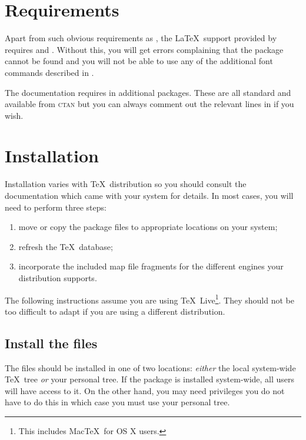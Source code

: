\documentclass[11pt,british]{article}
\begin{document}
\section{Requirements}

Apart from such obvious requirements as \LaTeXe, the \LaTeX\ support provided by  requires  and . Without this, you will get errors complaining that the package cannot be found and you will not be able to use any of the additional font commands described in .

The documentation requires in additional packages. These are all standard and available from \textsc{ctan} but you can always comment out the relevant lines in  if you wish.

\section{Installation}

Installation varies with \TeX\ distribution so you should consult the documentation which came with your system for details. In most cases, you will need to perform three steps:
		\begin{enumerate}
			\item move or copy the package files to appropriate locations on your system;
			\item refresh the \TeX\ database;
			\item incorporate the included map file fragments for the different engines your distribution supports.
		\end{enumerate}

The following instructions assume you are using \TeX~Live\footnote{This includes Mac\TeX\ for OS X users.}. They should not be too difficult to adapt if you are using a different distribution.

\subsection{Install the files}

The files should be installed in one of two locations: \emph{either} the local system-wide \TeX\ tree \emph{or} your personal tree. If the package is installed system-wide, all users will have access to it. On the other hand, you may need privileges you do not have to do this in which case you must use your personal tree.
\end{document}
